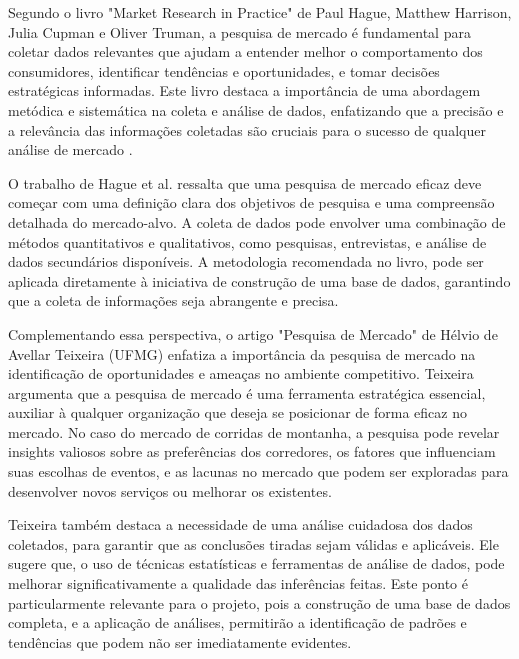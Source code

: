 Segundo o livro "Market Research in Practice" de Paul Hague, Matthew Harrison, Julia Cupman e Oliver Truman, a pesquisa de mercado é fundamental para coletar dados relevantes que ajudam a entender melhor o comportamento dos consumidores, identificar tendências e oportunidades, e tomar decisões estratégicas informadas. Este livro destaca a importância de uma abordagem metódica e sistemática na coleta e análise de dados, enfatizando que a precisão e a relevância das informações coletadas são cruciais para o sucesso de qualquer análise de mercado \cite{hague2021}.

O trabalho de Hague et al. \cite{hague2021} ressalta que uma pesquisa de mercado eficaz deve começar com uma definição clara dos objetivos de pesquisa e uma compreensão detalhada do mercado-alvo. A coleta de dados pode envolver uma combinação de métodos quantitativos e qualitativos, como pesquisas, entrevistas, e análise de dados secundários disponíveis. A metodologia recomendada no livro, pode ser aplicada diretamente à iniciativa de construção de uma base de dados, garantindo que a coleta de informações seja abrangente e precisa.

Complementando essa perspectiva, o artigo "Pesquisa de Mercado" de Hélvio de Avellar Teixeira (UFMG) enfatiza a importância da pesquisa de mercado na identificação de oportunidades e ameaças no ambiente competitivo. Teixeira \cite{teixeira2012} argumenta que a pesquisa de mercado é uma ferramenta estratégica essencial, auxiliar à qualquer organização que deseja se posicionar de forma eficaz no mercado. No caso do mercado de corridas de montanha, a pesquisa pode revelar insights valiosos sobre as preferências dos corredores, os fatores que influenciam suas escolhas de eventos, e as lacunas no mercado que podem ser exploradas para desenvolver novos serviços ou melhorar os existentes.

Teixeira \cite{teixeira2012} também destaca a necessidade de uma análise cuidadosa dos dados coletados, para garantir que as conclusões tiradas sejam válidas e aplicáveis. Ele sugere que, o uso de técnicas estatísticas e ferramentas de análise de dados, pode melhorar significativamente a qualidade das inferências feitas. Este ponto é particularmente relevante para o projeto, pois a construção de uma base de dados completa, e a aplicação de análises, permitirão a identificação de padrões e tendências que podem não ser imediatamente evidentes.

